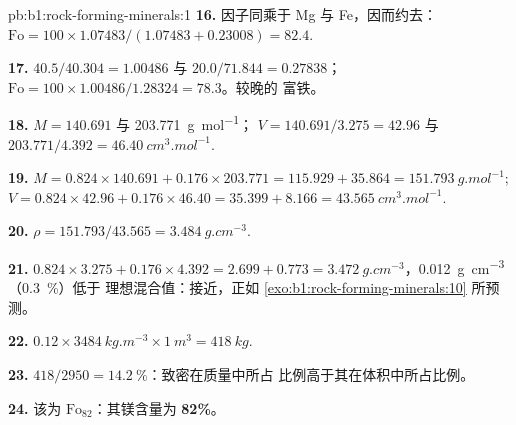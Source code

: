 \begin{solution}{pb:b1:rock-forming-minerals:1}
\textbf{16.} 因子同乘于 Mg 与 Fe，因而约去：
$\mathrm{Fo} = 100\times1.07483/(1.07483 + 0.23008) = 82.4$.

\textbf{17.} $40.5/40.304 = 1.00486$ 与 $20.0/71.844 = 0.27838$；
$\mathrm{Fo} = 100\times1.00486/1.28324 = 78.3$。较晚的
富铁。

\textbf{18.} $M = 140.691$ 与 \qty{203.771}{g.mol^{-1}}；
$V = 140.691/3.275 = 42.96$ 与 $203.771/4.392 =
\qty{46.40}{cm^3.mol^{-1}}$.

\textbf{19.} $M = 0.824\times140.691 + 0.176\times203.771 = 115.929 +
35.864 = \qty{151.793}{g.mol^{-1}}$; $V = 0.824\times42.96 +
0.176\times46.40 = 35.399 + 8.166 = \qty{43.565}{cm^3.mol^{-1}}$.

\textbf{20.} $\rho = 151.793/43.565 = \qty{3.484}{g.cm^{-3}}$.

\textbf{21.} $0.824\times3.275 + 0.176\times4.392 = 2.699 + 0.773 =
\qty{3.472}{g.cm^{-3}}$，\qty{0.012}{g.cm^{-3}}（\qty{0.3}{\percent}）低于
理想混合值：接近，正如 \cref{exo:b1:rock-forming-minerals:10}
所预测。

\textbf{22.} $0.12\times\qty{3484}{kg.m^{-3}}\times\qty{1}{m^3} =
\qty{418}{kg}$.

\textbf{23.} $418/2950 = \qty{14.2}{\percent}$：致密在质量中所占
比例高于其在体积中所占比例。

\textbf{24.} 该为 $\text{Fo}_{82}$：其镁含量为
\textbf{82\%}。
\end{solution}
